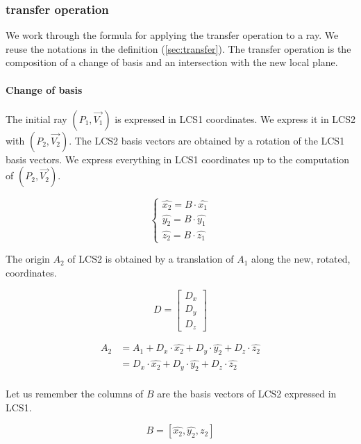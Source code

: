 \subsubsection{transfer operation}
We work through the formula for applying the transfer operation to a ray.
We reuse the notations in the definition (\cref{sec:transfer}). The transfer
operation is the composition of a change of basis and an intersection with
the new local plane.

\paragraph{Change of basis}
The initial ray $(P_1, \overrightarrow{V_1})$ is expressed in LCS1 coordinates.
We express it in LCS2 with $(P_2, \overrightarrow{V_2})$. The LCS2 basis vectors
are obtained by a rotation of the LCS1 basis vectors. We express everything
in LCS1 coordinates up to the computation of $(P_2, \overrightarrow{V_2})$.

\begin{equation} \begin{cases}
\hat{x_2} = B \cdot \hat{x_1} \\
\hat{y_2} = B \cdot \hat{y_1} \\
\hat{z_2} = B \cdot \hat{z_1}
\end{cases} \end{equation}

The origin $A_2$ of LCS2 is obtained by a translation of $A_1$ along
the new, rotated, coordinates.

\begin{equation}
D = \begin{bmatrix} D_x \\ D_y \\ D_z \end{bmatrix}
\end{equation}

\begin{equation} \begin{split}
A_2 &= A_1 + D_x \cdot \hat{x_2} + D_y \cdot \hat{y_2} + D_z \cdot \hat{z_2} \\
    &= D_x \cdot \hat{x_2} + D_y \cdot \hat{y_2} + D_z \cdot \hat{z_2} \\
\end{split} \end{equation}

Let us remember the columns of $B$ are the basis vectors of LCS2 expressed
in LCS1.

\begin{equation}
B = \left[ \hat{x_2}, \hat{y_2}, \hat{z_2} \right]
\end{equation}

